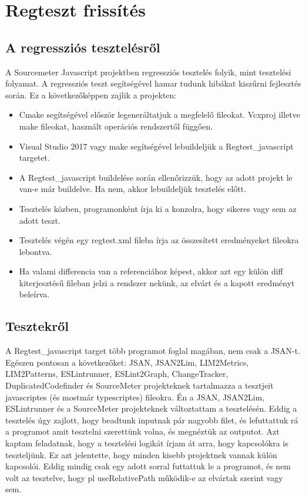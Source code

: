 \chapter{Regteszt frissítés}\label{chap:Regteszt frissítés}

\section{A regressziós tesztelésről}

\noindent

A Sourcemeter Javascript projektben regressziós tesztelés folyik, mint tesztelési folyamat.
A regressziós teszt segítségével hamar tudunk hibákat kiszűrni fejlesztés során.
Ez a következőképpen zajlik a projekten:

\begin{itemize}
      \item Cmake segítségével először legeneráltatjuk a megfelelő fileokat. Vcxproj illetve make fileokat, használt operációs rendszertől függően.
      \item Visual Studio 2017 vagy make segítségével lebuildeljük a Regtest\_javascript targetet.
      \item A Regtest\_javascript buildelése során ellenőrizzük, hogy az adott projekt le van-e már buildelve. Ha nem, akkor lebuildeljük tesztelés előtt.
      \item Tesztelés közben, programonként írja ki a konzolra, hogy sikeres vagy sem az adott teszt.
      \item Tesztelés végén egy regtest.xml fileba írja az összesített eredményeket fileokra lebontva.
      \item Ha valami differencia van a referenciához képest, akkor azt egy külön diff kiterjesztésű fileban jelzi a rendszer nekünk, az elvárt és a kapott eredményt beleírva.
\end{itemize}

\section{Tesztekről}

\noindent

A Regtest\_javascript target több programot foglal magában, nem csak a JSAN-t. Egészen pontosan a következőket:
JSAN, JSAN2Lim, LIM2Metrics, LIM2Patterns, ESLintrunner, ESLint2Graph, ChangeTracker, DuplicatedCodefinder és SourceMeter projekteknek tartalmazza a tesztjeit javascriptes (és mostmár typescriptes) fileokra.
Én a JSAN, JSAN2Lim, ESLintrunner és a SourceMeter projekteknek változtattam a tesztelésén.
Eddig a tesztelés úgy zajlott, hogy beadtunk inputnak pár nagyobb filet, és lefuttattuk rá a programot amit tesztelni szerettünk volna, és megnéztük az outputot.
Azt kaptam feladatnak, hogy a tesztelési logikát írjam át arra, hogy kapcsolókra is teszteljünk.
Ez azt jelentette, hogy minden kisebb projektnek vannak külön kapcsolói. Eddig mindig csak egy adott sorral futtattuk le a programot, és nem volt az tesztelve, hogy pl useRelativePath működik-e az elvártak szerint vagy sem.

